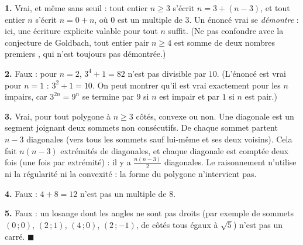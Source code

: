 \textbf{1.} Vrai, et même sans seuil : tout entier $n \geqslant 3$ s'écrit
$n = 3 + (n - 3)$, et tout entier $n$ s'écrit $n = 0 + n$, où $0$ est un
multiple de $3$. Un énoncé vrai se \emph{démontre} : ici, une écriture
explicite valable pour tout $n$ suffit. (Ne pas confondre avec la conjecture
de Goldbach, \og tout entier pair $n \geqslant 4$ est somme de deux nombres
premiers \fg, qui n'est toujours pas démontrée.)

\textbf{2.} Faux : pour $n = 2$, $3^4 + 1 = 82$ n'est pas divisible par $10$.
(L'énoncé est vrai pour $n = 1$ : $3^2 + 1 = 10$. On peut montrer qu'il est
vrai exactement pour les $n$ impairs, car $3^{2n} = 9^n$ se termine par $9$
si $n$ est impair et par $1$ si $n$ est pair.)

\textbf{3.} Vrai, pour tout polygone à $n \geqslant 3$ côtés, convexe ou non.
Une diagonale est un segment joignant deux sommets non consécutifs. De
chaque sommet partent $n - 3$ diagonales (vers tous les sommets sauf
lui-même et ses deux voisins). Cela fait $n(n-3)$ extrémités de diagonales,
et chaque diagonale est comptée deux fois (une fois par extrémité) : il y a
$\frac{n(n-3)}{2}$ diagonales. Le raisonnement n'utilise ni la régularité ni
la convexité : la forme du polygone n'intervient pas.

\textbf{4.} Faux : $4 + 8 = 12$ n'est pas un multiple de $8$.

\textbf{5.} Faux : un losange dont les angles ne sont pas droits (par exemple
de sommets $(0\,;0)$, $(2\,;1)$, $(4\,;0)$, $(2\,;-1)$, de côtés tous égaux à
$\sqrt5$) n'est pas un carré. \hfill $\blacksquare$

